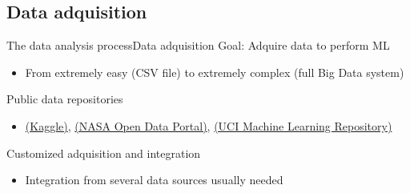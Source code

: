 \documentclass[10pt,compress]{beamer} %
\begin{document}
\subsection{Data adquisition}
\begin{frame}{The data analysis process}{Data adquisition}
	Goal: Adquire data to perform ML
		\begin{itemize}
		\item From extremely easy (CSV file) to extremely complex (full Big Data system)
		\end{itemize}

	Public data repositories
		\begin{itemize}
		\item \href{https://www.kaggle.com/}{(Kaggle)}, \href{https://data.nasa.gov/}{(NASA Open Data Portal)}, \href{https://archive.ics.uci.edu/ml/index.php}{(UCI Machine Learning Repository)}
		\end{itemize}
	Customized adquisition and integration
		\begin{itemize}
		\item Integration from several data sources usually needed
		\end{itemize}

		\begin{figure}
		\centering{
		\resizebox{0.6\textwidth}{!}{}}
		\end{figure}
\end{frame}
\end{document}
